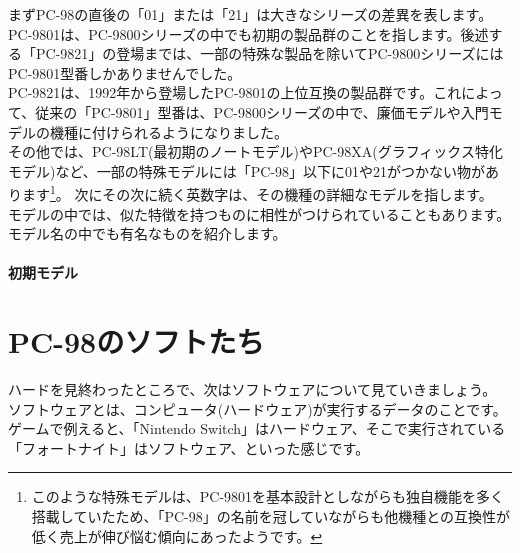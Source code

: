 \documentclass[b5paper,9pt,platex,dvipdfmx]{jsarticle}
\begin{document}
\begin{multicols}{3}
まずPC-98の直後の「01」または「21」は大きなシリーズの差異を表します。\\
PC-9801は、PC-9800シリーズの中でも初期の製品群のことを指します。後述する「PC-9821」の登場までは、一部の特殊な製品を除いてPC-9800シリーズにはPC-9801型番しかありませんでした。\\
PC-9821は、1992年から登場したPC-9801の上位互換の製品群です。これによって、従来の「PC-9801」型番は、PC-9800シリーズの中で、廉価モデルや入門モデルの機種に付けられるようになりました。\\
その他では、PC-98LT(最初期のノートモデル)やPC-98XA(グラフィックス特化モデル)など、一部の特殊モデルには「PC-98」以下に01や21がつかない物があります\footnote{このような特殊モデルは、PC-9801を基本設計としながらも独自機能を多く搭載していたため、「PC-98」の名前を冠していながらも他機種との互換性が低く売上が伸び悩む傾向にあったようです。}。
次にその次に続く英数字は、その機種の詳細なモデルを指します。\\
モデルの中では、似た特徴を持つものに相性がつけられていることもあります。\\
モデル名の中でも有名なものを紹介します。\\
\subsection{初期モデル}


\part{PC-98のソフトたち}
\setcounter{section}{0}
ハードを見終わったところで、次はソフトウェアについて見ていきましょう。\\
ソフトウェアとは、コンピュータ(ハードウェア)が実行するデータのことです。\\
ゲームで例えると、「Nintendo Switch」はハードウェア、そこで実行されている「フォートナイト」はソフトウェア、といった感じです。

\end{multicols}
\end{document}
